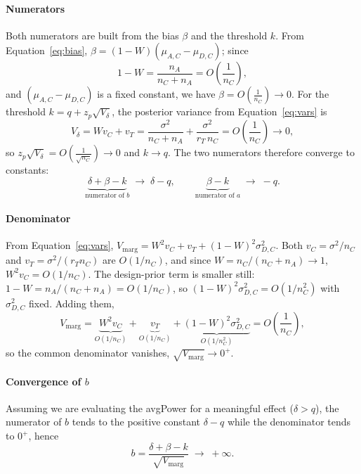 \paragraph{Numerators} Both numerators are built from the bias $\beta$ and the threshold $k$.
From Equation~\eqref{eq:bias}, $\beta = (1 - W)(\mu_{A,C} - \mu_{D,C})$; since
\[
  1 - W = \frac{n_A}{n_C + n_A} = O\!\left(\frac{1}{n_C}\right),
\]
and $(\mu_{A,C} - \mu_{D,C})$ is a fixed constant, we have $\beta = O\!\left(\frac{1}{n_C}\right) \to 0$. For the threshold $k = q + z_p \sqrt{V_\delta}$, the posterior variance from Equation~\eqref{eq:vars} is
\[
  V_\delta = W v_C + v_T = \frac{\sigma^2}{n_C + n_A} + \frac{\sigma^2}{r_T\, n_C} = O\!\left(\frac{1}{n_C}\right) \to 0,
\]
so $z_p \sqrt{V_\delta} = O\!\left(\frac{1}{\sqrt{n_C}}\right) \to 0$ and $k \to q$. The two numerators therefore converge to constants:
\[
  \underbrace{\delta + \beta - k}_{\text{numerator of } b} \;\longrightarrow\; \delta - q,
  \qquad
  \underbrace{\beta - k}_{\text{numerator of } a} \;\longrightarrow\; -q.
\]

\paragraph{Denominator} From Equation~\eqref{eq:vars}, $V_{\mathrm{marg}} = W^2 v_C + v_T + (1 - W)^2 \sigma_{D,C}^2$. Both $v_C = \sigma^2/n_C$ and $v_T = \sigma^2/(r_T n_C)$ are $O(1/n_C)$, and since $W = n_C/(n_C+n_A) \to 1$, $W^2 v_C = O(1/n_C)$. The 
design-prior term is smaller still: $1 - W = n_A/(n_C+n_A) = O(1/n_C)$, so $(1 - W)^2 \sigma_{D,C}^2 = O(1/n_C^2)$ with $\sigma_{D,C}^2$ fixed. Adding them,
\[
  V_{\mathrm{marg}}
  = \underbrace{W^2 v_C}_{O(1/n_C)}
  + \underbrace{v_T}_{O(1/n_C)}
  + \underbrace{(1 - W)^2 \sigma_{D,C}^2}_{O(1/n_C^2)}
  = O\!\left(\frac{1}{n_C}\right),
\]
so the common denominator vanishes, $\sqrt{V_{\mathrm{marg}}} \to 0^+$.

\paragraph{Convergence of $b$} Assuming we are evaluating the avgPower for a meaningful effect ($\delta > q$), the numerator of $b$ tends to the positive constant $\delta - q$ while the denominator tends to $0^+$, hence
\[
  b = \frac{\delta + \beta - k}{\sqrt{V_{\mathrm{marg}}}} \;\longrightarrow\; +\infty .
\]

